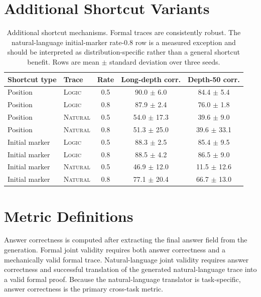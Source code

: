 \documentclass[11pt]{article}
\newcommand{\logic}{\textsc{Logic}}
\newcommand{\nl}{\textsc{Natural}}
\begin{document}
\section{Additional Shortcut Variants}
\label{sec:shortcut-kind}

\begin{table}[h]
\centering
\scriptsize
\begin{tabular}{llccc}
\toprule
Shortcut type & Trace & Rate & Long-depth corr. & Depth-50 corr. \\
\midrule
Position & \logic{} & 0.5 & 90.0 $\pm$ 6.0 & 84.4 $\pm$ 5.4 \\
Position & \logic{} & 0.8 & 87.9 $\pm$ 2.4 & 76.0 $\pm$ 1.8 \\
Position & \nl{} & 0.5 & 54.0 $\pm$ 17.3 & 39.6 $\pm$ 9.0 \\
Position & \nl{} & 0.8 & 51.3 $\pm$ 25.0 & 39.6 $\pm$ 33.1 \\
\midrule
Initial marker & \logic{} & 0.5 & 88.3 $\pm$ 2.5 & 85.4 $\pm$ 9.5 \\
Initial marker & \logic{} & 0.8 & 88.5 $\pm$ 4.2 & 86.5 $\pm$ 9.0 \\
Initial marker & \nl{} & 0.5 & 46.9 $\pm$ 12.0 & 11.5 $\pm$ 12.6 \\
Initial marker & \nl{} & 0.8 & 77.1 $\pm$ 20.4 & 66.7 $\pm$ 13.0 \\
\bottomrule
\end{tabular}
\caption{Additional shortcut mechanisms. Formal traces are consistently robust.
The natural-language initial-marker rate-0.8 row is a measured exception and
should be interpreted as distribution-specific rather than a general shortcut
benefit. Rows are mean $\pm$ standard deviation over three seeds.}
\label{tab:shortcut-kind}
\end{table}

\section{Metric Definitions}

Answer correctness is computed after extracting the final answer field from the
generation. Formal joint validity requires both answer correctness and a
mechanically valid formal trace. Natural-language joint validity requires answer
correctness and successful translation of the generated natural-language trace
into a valid formal proof. Because the natural-language translator is
task-specific, answer correctness is the primary cross-task metric.



\end{document}
